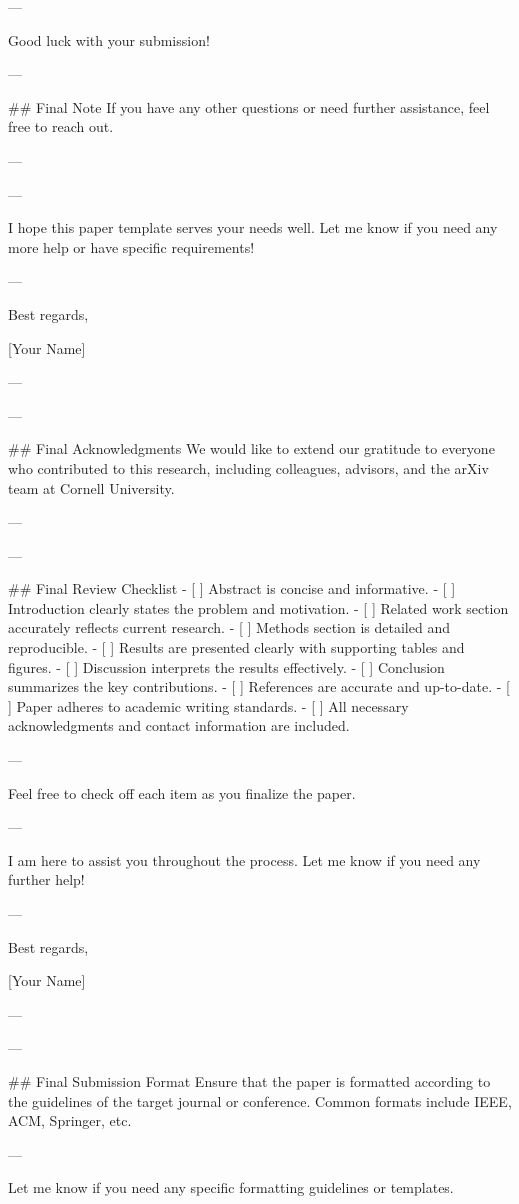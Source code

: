 --- 

Good luck with your submission! 

--- 

## Final Note
If you have any other questions or need further assistance, feel free to reach out. 

--- 

---

I hope this paper template serves your needs well. Let me know if you need any more help or have specific requirements! 

--- 

Best regards, 

[Your Name] 

--- 

---

## Final Acknowledgments
We would like to extend our gratitude to everyone who contributed to this research, including colleagues, advisors, and the arXiv team at Cornell University. 

--- 

---

## Final Review Checklist
- [ ] Abstract is concise and informative.
- [ ] Introduction clearly states the problem and motivation.
- [ ] Related work section accurately reflects current research.
- [ ] Methods section is detailed and reproducible.
- [ ] Results are presented clearly with supporting tables and figures.
- [ ] Discussion interprets the results effectively.
- [ ] Conclusion summarizes the key contributions.
- [ ] References are accurate and up-to-date.
- [ ] Paper adheres to academic writing standards.
- [ ] All necessary acknowledgments and contact information are included.

--- 

Feel free to check off each item as you finalize the paper. 

--- 

I am here to assist you throughout the process. Let me know if you need any further help! 

--- 

Best regards, 

[Your Name] 

--- 

---

## Final Submission Format
Ensure that the paper is formatted according to the guidelines of the target journal or conference. Common formats include IEEE, ACM, Springer, etc.

--- 

Let me know if you need any specific formatting guidelines or templates. 

